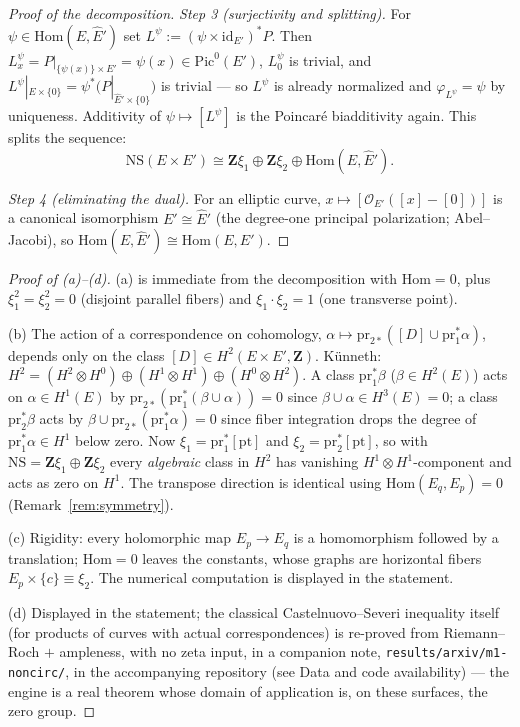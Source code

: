 \documentclass[11pt]{article}
\theoremstyle{definition}
\theoremstyle{remark}
\newcommand{\Z}{\mathbf{Z}}
\newcommand{\NS}{\mathrm{NS}}
\newcommand{\Hom}{\mathrm{Hom}}
\newcommand{\Pic}{\mathrm{Pic}}
\newcommand{\pr}{\mathrm{pr}}
\begin{document}
\begin{proof}[Proof of the decomposition]
\emph{Step 3 (surjectivity and splitting).} For $\psi \in \Hom(E, \hat{E}')$
set $L^\psi := (\psi \times \mathrm{id}_{E'})^* P$. Then
$L^\psi_x = P|_{\{\psi(x)\}\times E'} = \psi(x) \in \Pic^0(E')$, $L^\psi_0$
is trivial, and $L^\psi|_{E\times\{0\}} = \psi^*\bigl(P|_{\hat{E}'\times\{0\}}\bigr)$
is trivial --- so $L^\psi$ is already normalized and
$\varphi_{L^\psi} = \psi$ by uniqueness. Additivity of
$\psi \mapsto [L^\psi]$ is the Poincar\'e biadditivity again. This splits
the sequence:
\[
\NS(E\times E') \cong \Z\xi_1 \oplus \Z\xi_2 \oplus \Hom(E, \hat{E}') .
\]

\emph{Step 4 (eliminating the dual).} For an elliptic curve,
$x \mapsto [\mathcal{O}_{E'}([x] - [0])]$ is a canonical isomorphism
$E' \cong \hat{E}'$ (the degree-one principal polarization; Abel--Jacobi),
so $\Hom(E, \hat{E}') \cong \Hom(E, E')$.
\end{proof}

\begin{proof}[Proof of \textup{(a)}--\textup{(d)}]
(a) is immediate from the decomposition with $\Hom = 0$, plus
$\xi_1^2 = \xi_2^2 = 0$ (disjoint parallel fibers) and
$\xi_1\cdot\xi_2 = 1$ (one transverse point).

(b) The action of a correspondence on cohomology,
$\alpha \mapsto \pr_{2*}([D] \cup \pr_1^*\alpha)$, depends only on the class
$[D] \in H^2(E\times E', \Z)$. K\"unneth:
$H^2 = (H^2\otimes H^0) \oplus (H^1\otimes H^1) \oplus (H^0\otimes H^2)$. A
class $\pr_1^*\beta$ ($\beta \in H^2(E)$) acts on $\alpha \in H^1(E)$ by
$\pr_{2*}(\pr_1^*(\beta \cup \alpha)) = 0$ since
$\beta \cup \alpha \in H^3(E) = 0$; a class $\pr_2^*\beta$ acts by
$\beta \cup \pr_{2*}(\pr_1^*\alpha) = 0$ since fiber integration drops the
degree of $\pr_1^*\alpha \in H^1$ below zero. Now $\xi_1 = \pr_1^*[\mathrm{pt}]$
and $\xi_2 = \pr_2^*[\mathrm{pt}]$, so with $\NS = \Z\xi_1 \oplus \Z\xi_2$
every \emph{algebraic} class in $H^2$ has vanishing
$H^1\otimes H^1$-component and acts as zero on $H^1$. The transpose
direction is identical using $\Hom(E_q, E_p) = 0$
(Remark~\ref{rem:symmetry}).

(c) Rigidity: every holomorphic map $E_p \to E_q$ is a homomorphism followed
by a translation; $\Hom = 0$ leaves the constants, whose graphs are
horizontal fibers $E_p \times \{c\} \equiv \xi_2$. The numerical computation
is displayed in the statement.

(d) Displayed in the statement; the classical Castelnuovo--Severi inequality
itself (for products of curves with actual correspondences) is re-proved
from Riemann--Roch $+$ ampleness, with no zeta input, in a companion note,
\texttt{results/arxiv/}\allowbreak\texttt{m1-noncirc/}, in the accompanying
repository (see Data and code availability) --- the engine is a real theorem
whose domain of application is, on these surfaces, the zero group.
\end{proof}
\end{document}
